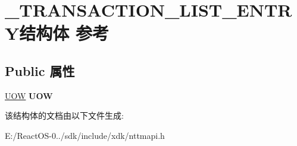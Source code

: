 \hypertarget{struct___t_r_a_n_s_a_c_t_i_o_n___l_i_s_t___e_n_t_r_y}{}\section{\+\_\+\+T\+R\+A\+N\+S\+A\+C\+T\+I\+O\+N\+\_\+\+L\+I\+S\+T\+\_\+\+E\+N\+T\+R\+Y结构体 参考}
\label{struct___t_r_a_n_s_a_c_t_i_o_n___l_i_s_t___e_n_t_r_y}
\subsection*{Public 属性}
\begin{DoxyCompactItemize}
\item 
\mbox{\label{struct___t_r_a_n_s_a_c_t_i_o_n___l_i_s_t___e_n_t_r_y_ad9a49f11e947a75f958455eec40f2bed}} 
\hyperlink{interface_g_u_i_d}{U\+OW} {\bfseries U\+OW}
\end{DoxyCompactItemize}


该结构体的文档由以下文件生成\+:\begin{DoxyCompactItemize}
\item 
E\+:/\+React\+O\+S-\/0../sdk/include/xdk/nttmapi.\+h\end{DoxyCompactItemize}
